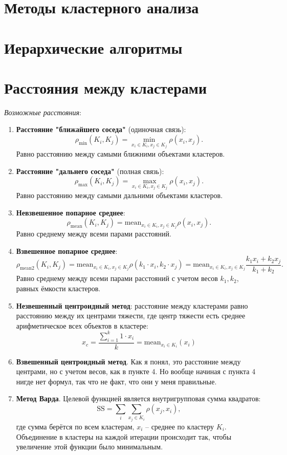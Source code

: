 \documentclass[a4paper, 12pt]{article}
\begin{document}
\section{Методы кластерного анализа}
\section{Иерархические алгоритмы}
\section{Расстояния между кластерами}

{\it Возможные расстояния}:
\begin{enumerate}
    \item \textbf{Расстояние "ближайшего соседа"} (одиночная связь): $$\rho_{\min}(K_i,K_j)=\min_{x_i \in K_i, x_j \in K_j} \rho (x_i,x_j).$$ Равно расстоянию между самыми ближними объектами кластеров.
    \item \textbf{Расстояние "дальнего соседа"} (полная связь):$$\rho_{\max}(K_i,K_j)=\max_{x_i \in K_i, x_j \in K_j} \rho (x_i,x_j).$$ Равно расстоянию между самыми дальними объектами кластеров.
    \item \textbf{Невзвешенное попарное среднее}: $$\rho_{\text{mean}}(K_i,K_j)=\text{mean}_{x_i \in K_i, x_j \in K_j} \rho (x_i,x_j).$$ Равно среднему между всеми парами расстояний.
    \item \textbf{Взвешенное попарное среднее}: $$\rho_{\text{mean2}}(K_i,K_j)=\text{mean}_{x_i \in K_i, x_j \in K_j} \rho (k_1 \cdot x_i,k_2 \cdot x_j) = \text{mean}_{x_i \in K_i, x_j \in K_j} \dfrac{k_1 x_i + k_2 x_j}{k_1+k_2}.$$ Равно среднему между всеми парами расстояний с учетом весов $k_1,k_2$, равных ёмкости кластеров.
    \item \textbf{Незвешенный центроидный метод}: расстояние между кластерами равно расстоянию между их центрами тяжести, где центр тяжести есть среднее арифметическое всех объектов в кластере: $$x_c = \dfrac{\sum_{i=1}^k 1 \cdot x_i}{k}= \text{mean}_{x_i \in K_i} (x_i)$$
    \item \textbf{Взвешенный центроидный метод}. Как я понял, это расстояние между центрами, но с учетом весов, как в пункте 4. Но вообще начиная с пункта 4 нигде нет формул, так что не факт, что они у меня правильные.
    \item \textbf{Метод Варда}. Целевой функцией является внутригрупповая сумма квадратов: $$\text{SS}=\sum_i \sum_{x_j \in K_i} \rho(x_j,x_i),$$
    где сумма берётся по всем кластерам, $x_i$ -- среднее по кластеру $K_i$. Объединение в кластеры на каждой итерации происходит так, чтобы увеличение этой функции было минимальным.
\end{enumerate}
\end{document}
